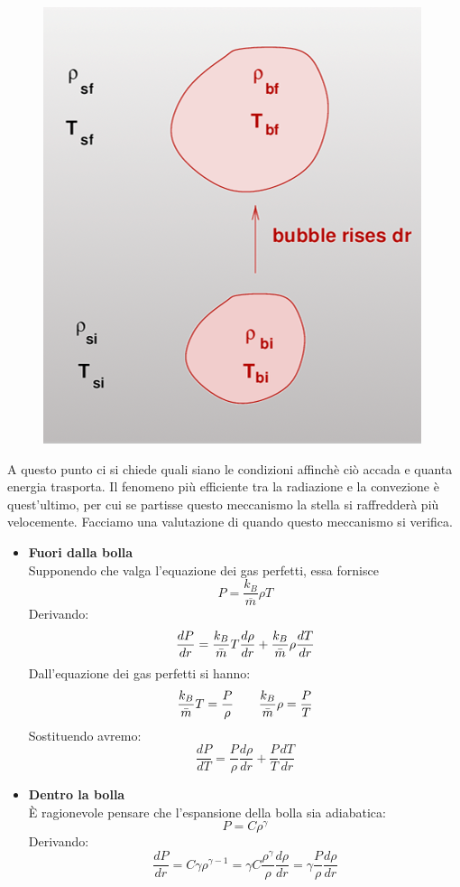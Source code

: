 \documentclass[a4paper,11pt]{article}
\begin{document}
\begin{figure}[h!]
    \centering
    \includegraphics[scale=0.5]{bolla.png}
    \label{bolla}
\end{figure}
A questo punto ci si chiede quali siano le condizioni affinchè ciò accada e quanta energia trasporta. Il fenomeno più efficiente tra la radiazione e la convezione è quest'ultimo, per cui se partisse questo meccanismo la stella si raffredderà più velocemente. Facciamo una valutazione di quando questo meccanismo si verifica.
\begin{itemize}
    \item \textbf{Fuori dalla bolla}\\
    Supponendo che valga l'equazione dei gas perfetti, essa fornisce
    $$P=\frac{k_B}{\overline{m}}\rho T$$
    Derivando:
    $$\frac{dP}{dr}=\frac{k_B}{\Bar{m}}T\frac{d\rho}{dr}+\frac{k_B}{\Bar{m}}\rho \frac{dT}{dr}$$
    Dall'equazione dei gas perfetti si hanno:
    $$\frac{k_B}{\Bar{m}}T=\frac{P}{\rho}\qquad \frac{k_B}{\Bar{m}}\rho=\frac{P}{T}$$
    Sostituendo avremo:
    $$\frac{dP}{dT}=\frac{P}{\rho}\frac{d\rho}{dr}+\frac{P}{T}\frac{dT}{dr}$$
    \item \textbf{Dentro la bolla}\\
    \uppercase{è} ragionevole pensare che l'espansione della bolla sia adiabatica:
    $$P=C\rho^\gamma$$
    Derivando:
    $$\frac{dP}{dr}=C\gamma\rho^{\gamma-1}=\gamma C\frac{\rho^\gamma}{\rho}\frac{d\rho}{dr}=\gamma\frac{P}{\rho}\frac{d\rho}{dr}$$
\end{itemize}
\end{document}
